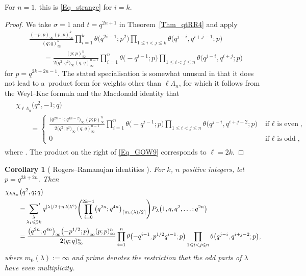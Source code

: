 \documentclass[pdftex]{sigma}
\numberwithin{equation}{section}
\newtheorem{Corollary}[Theorem]{Corollary}
\renewcommand{\leq}{\leqslant}
\newcommand{\ceil}[1]{\lceil#1\rceil}
\newcommand{\abs}[1]{\vert#1\vert}
\newcommand{\la}{\lambda}
\newcommand{\La}{\Lambda}
\begin{document}
For $n=1$, this is \eqref{Eq_strange} for $i=k$.

\begin{proof}
We take $\sigma=1$ and $t=q^{2n+1}$ in Theorem~\ref{Thm_qtRR4} and apply
\begin{align*}
&\frac{(-p;p)_{\infty}(p;p)_{\infty}^k}
{(q;q)_{\infty}^k}
\prod_{i=1}^k \theta\bigl(q^{2i-1};p^2\bigr)
\prod_{1\leq i<j\leq k}\theta\bigl(q^{j-i},q^{i+j-1};p\bigr) \\
&\qquad=\frac{(p;p)_{\infty}^n}
{2\bigl(q^2;q^2\bigr)_{\infty}(q;q)_{\infty}^{n-1}}
\prod_{i=1}^n \theta\bigl({-}q^{i-1};p\bigr)
\prod_{1\leq i<j\leq n}\theta\bigl(q^{j-i},q^{i+j};p\bigr)
\end{align*}
for $p=q^{2k+2n-1}$.
The stated specialisation is somewhat unusual in that it does
not lead to a~product form for weights other than $\ell\La_n$, for
which it follows from the Weyl--Kac formula and the 
Macdonald identity that
\begin{align*}
\begin{split}
& \chi_{\ell\La_n}\bigl(q^2,-1;q\bigr) \\
&\qquad=\begin{cases}\displaystyle
\frac{\bigl(q^{2n-1};q^{4n-2}\bigr)_{\infty}
(p;p)_{\infty}^n}
{2\bigl(q^2;q^2\bigr)_{\infty}(q;q)_{\infty}^{n-1}}
\prod_{i=1}^n \theta\bigl({-}q^{i-1};p\bigr)
\prod_{1\leq i<j\leq n}
\theta\bigl(q^{j-i},q^{i+j-2};p\bigr)
&\text{if $\ell$ is even}, \\[3mm] 0 &\text{if $\ell$ is odd},
\end{cases}
\end{split}
\end{align*}
where .
The product on the right of \eqref{Eq_GOW9} corresponds to $\ell=2k$.
\end{proof}


\begin{Corollary}[ Rogers--Ramanujan identities
{\cite[Theorem 5.17]{RW21}}]\label{Cor_17}
For $k$, $n$ positive integers, let $p=q^{2k+2n}$.
Then
\begin{align*}
&\chi_{k\La_n}\bigl(q^2,q;q\bigr) \\
&\qquad=\sideset{}{'}\sum_{\substack{\la \\[1pt] \la_1\leq 2k}}
q^{\abs{\la}/2+n\,l(\la^{\textup{o}})}
\Biggl(\prod_{i=0}^{2k-1}\bigl(q^{2n};q^{4n}\bigr)_{\ceil{m_i(\la)/2}}\Biggr)
P_{\la}\bigl(1,q,q^2,\dots;q^{2n}\bigr) \\
&\qquad=\frac{\bigl(q^{2n};q^{4n}\bigr)_{\infty}\bigl(-p^{1/2};p\bigr)_{\infty}(p;p)_{\infty}^n}
{2(q;q)_{\infty}^n}
\prod_{i=1}^n \theta\bigl({-}q^{i-1},p^{1/2}q^{i-1};p\bigr)
\prod_{1\leq i<j\leq n}\theta\bigl(q^{j-i},q^{i+j-2};p\bigr),
\end{align*}
where $m_0(\la):=\infty$ and prime denotes the restriction that
the odd parts of $\la$ have even multiplicity.
\end{Corollary}
\end{document}
